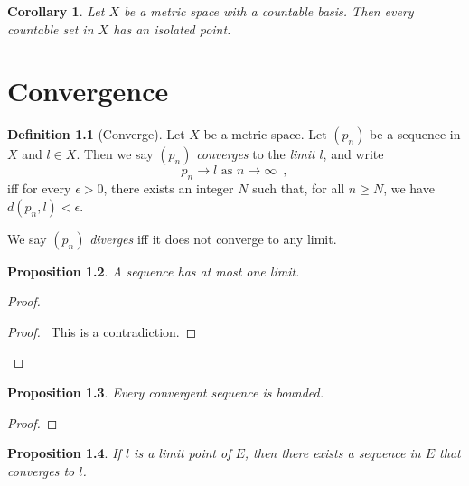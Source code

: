 \documentclass{book}
\let\qed\relax
\newtheorem{prop}{Proposition}[chapter]
\newtheorem{cor}{Corollary}[prop]
\theoremstyle{definition}
\newtheorem{df}[prop]{Definition}
\begin{document}
\begin{cor}
Let $X$ be a metric space with a countable basis. Then every countable set in $X$ has an isolated point.
\end{cor}

\chapter{Convergence}

\begin{df}[Converge]
Let $X$ be a metric space. Let $(p_n)$ be a sequence in $X$ and $l \in X$. Then we say $(p_n)$ \emph{converges} to the \emph{limit} $l$, and write
\[ p_n \rightarrow l \text{ as } n \rightarrow \infty \enspace , \]
iff for every $\epsilon > 0$, there exists an integer $N$ such that, for all $n \geq N$, we have $d(p_n,l) < \epsilon$.

We say $(p_n)$ \emph{diverges} iff it does not converge to any limit.
\end{df}

\begin{prop}
A sequence has at most one limit.
\end{prop}

\begin{proof}
\pf
{}
\qedstep
\begin{proof}
	\pf\ This is a contradiction.
\end{proof}
\qed
\end{proof}

\begin{prop}
Every convergent sequence is bounded.
\end{prop}

\begin{proof}
\pf
{}
\qed
\end{proof}

\begin{prop}
If $l$ is a limit point of $E$, then there exists a sequence in $E$ that converges to $l$.
\end{prop}
\end{document}

